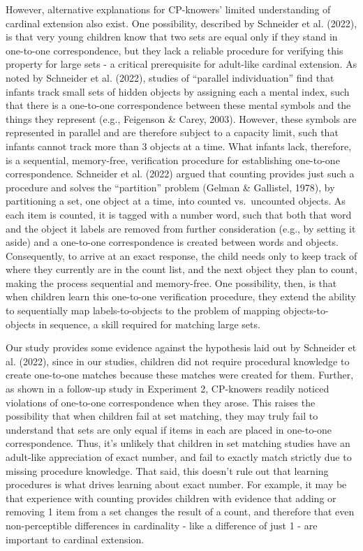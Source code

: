 \documentclass[
  man,floatsintext]{apa7}
\begin{document}
However, alternative explanations for CP-knowers' limited understanding of cardinal extension also exist. One possibility, described by Schneider et al. (2022), is that very young children know that two sets are equal only if they stand in one-to-one correspondence, but they lack a reliable procedure for verifying this property for large sets - a critical prerequisite for adult-like cardinal extension. As noted by Schneider et al. (2022), studies of ``parallel individuation'' find that infants track small sets of hidden objects by assigning each a mental index, such that there is a one-to-one correspondence between these mental symbols and the things they represent (e.g., Feigenson \& Carey, 2003). However, these symbols are represented in parallel and are therefore subject to a capacity limit, such that infants cannot track more than 3 objects at a time. What infants lack, therefore, is a sequential, memory-free, verification procedure for establishing one-to-one correspondence. Schneider et al. (2022) argued that counting provides just such a procedure and solves the ``partition'' problem (Gelman \& Gallistel, 1978), by partitioning a set, one object at a time, into counted vs.~uncounted objects. As each item is counted, it is tagged with a number word, such that both that word and the object it labels are removed from further consideration (e.g., by setting it aside) and a one-to-one correspondence is created between words and objects. Consequently, to arrive at an exact response, the child needs only to keep track of where they currently are in the count list, and the next object they plan to count, making the process sequential and memory-free. One possibility, then, is that when children learn this one-to-one verification procedure, they extend the ability to sequentially map labels-to-objects to the problem of mapping objects-to-objects in sequence, a skill required for matching large sets.

Our study provides some evidence against the hypothesis laid out by Schneider et al. (2022), since in our studies, children did not require procedural knowledge to create one-to-one matches because these matches were created for them. Further, as shown in a follow-up study in Experiment 2, CP-knowers readily noticed violations of one-to-one correspondence when they arose. This raises the possibility that when children fail at set matching, they may truly fail to understand that sets are only equal if items in each are placed in one-to-one correspondence. Thus, it's unlikely that children in set matching studies have an adult-like appreciation of exact number, and fail to exactly match strictly due to missing procedure knowledge. That said, this doesn't rule out that learning procedures is what drives learning about exact number. For example, it may be that experience with counting provides children with evidence that adding or removing 1 item from a set changes the result of a count, and therefore that even non-perceptible differences in cardinality - like a difference of just 1 - are important to cardinal extension.
\end{document}
